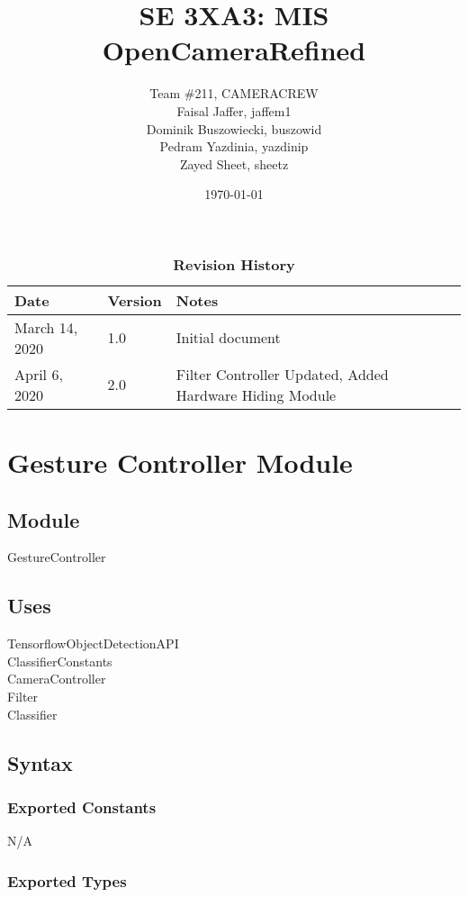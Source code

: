 \documentclass[12pt, titlepage]{article}
\title{SE 3XA3: MIS\\OpenCameraRefined}
\author{Team \#211, CAMERACREW
		\\ Faisal Jaffer, jaffem1
		\\ Dominik Buszowiecki, buszowid
		\\ Pedram Yazdinia, yazdinip
		\\ Zayed Sheet, sheetz
}
\date{\today}
\begin{document}
\maketitle


\begin{table}[hp]
\caption{\bf Revision History}
\begin{tabularx}{\textwidth}{p{3cm}p{2cm}X}
\toprule {\bf Date} & {\bf Version} & {\bf Notes}\\
\midrule
March 14, 2020 & 1.0 & Initial document\\
\midrule
April 6, 2020 & 2.0 & Filter Controller Updated, Added Hardware Hiding Module\\
\bottomrule
\end{tabularx}
\end{table}

\newpage

\section* {Gesture Controller Module}

\subsection*{Module}

GestureController

\subsection* {Uses}

TensorflowObjectDetectionAPI \\
ClassifierConstants \\
CameraController \\
Filter \\
Classifier

\subsection* {Syntax}

\subsubsection* {Exported Constants}

N/A

\subsubsection* {Exported Types}
\end{document}
